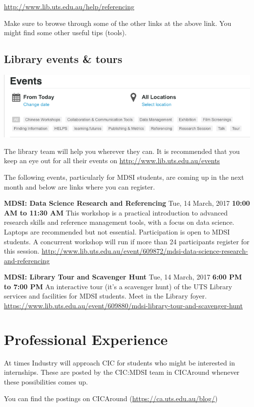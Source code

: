 \documentclass[]{book}
\theoremstyle{definition}
\theoremstyle{definition}
\theoremstyle{remark}
\begin{document}
\url{http://www.lib.uts.edu.au/help/referencing}

Make sure to browse through some of the other links at the above link.
You might find some other useful tips (tools).

\subsection{Library events \& tours}\label{library-events-tours}

\includegraphics[width=0.5\linewidth]{Images/LibraryEvents}

The library team will help you wherever they can. It is recommended that
you keep an eye out for all their events on
\url{http://www.lib.uts.edu.au/events}

The following events, particularly for MDSI students, are coming up in
the next month and below are links where you can register.

\textbf{MDSI: Data Science Research and Referencing} Tue, 14 March, 2017
\textbf{10:00 AM to 11:30 AM} This workshop is a practical introduction
to advanced research skills and reference management tools, with a focus
on data science. Laptops are recommended but not essential.
Participation is open to MDSI students. A concurrent workshop will run
if more than 24 participants register for this session.
\url{http://www.lib.uts.edu.au/event/609872/mdsi-data-science-research-and-referencing}

\textbf{MDSI: Library Tour and Scavenger Hunt} Tue, 14 March, 2017
\textbf{6:00 PM to 7:00 PM} An interactive tour (it's a scavenger hunt)
of the UTS Library services and facilities for MDSI students. Meet in
the Library foyer.
\url{https://www.lib.uts.edu.au/event/609880/mdsi-library-tour-and-scavenger-hunt}

\section{Professional Experience}\label{professional-experience}

At times Industry will approach CIC for students who might be interested
in internships. These are posted by the CIC:MDSI team in CICAround
whenever these possibilities comes up.

You can find the postings on CICAround
(\url{https://ca.uts.edu.au/blog/})
\end{document}
